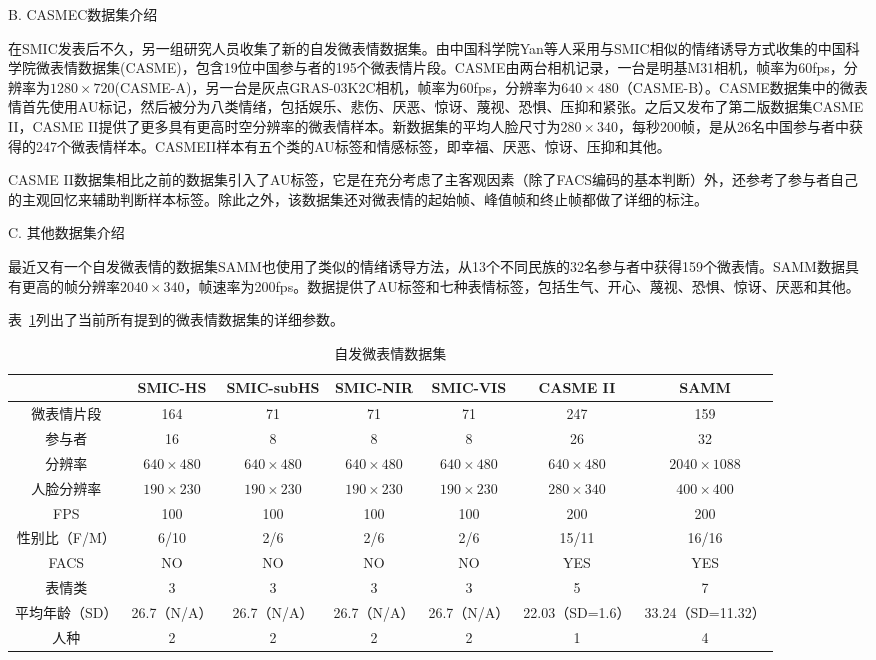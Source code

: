B. CASMEC数据集介绍

在SMIC发表后不久，另一组研究人员收集了新的自发微表情数据集。由中国科学院Yan等人采用与SMIC相似的情绪诱导方式收集的中国科学院微表情数据集(CASME)，包含19位中国参与者的195个微表情片段。CASME由两台相机记录，一台是明基M31相机，帧率为60fps，分辨率为$1280\times720$(CASME-A)，另一台是灰点GRAS-03K2C相机，帧率为60fps，分辨率为$640\times480$（CASME-B）。CASME数据集中的微表情首先使用AU标记，然后被分为八类情绪，包括娱乐、悲伤、厌恶、惊讶、蔑视、恐惧、压抑和紧张。之后又发布了第二版数据集CASME II，CASME II提供了更多具有更高时空分辨率的微表情样本。新数据集的平均人脸尺寸为$280\times340$，每秒200帧，是从26名中国参与者中获得的247个微表情样本。CASMEII样本有五个类的AU标签和情感标签，即幸福、厌恶、惊讶、压抑和其他。

CASME II数据集相比之前的数据集引入了AU标签，它是在充分考虑了主客观因素（除了FACS编码的基本判断）外，还参考了参与者自己的主观回忆来辅助判断样本标签。除此之外，该数据集还对微表情的起始帧、峰值帧和终止帧都做了详细的标注。

C. 其他数据集介绍

最近又有一个自发微表情的数据集SAMM也使用了类似的情绪诱导方法，从13个不同民族的32名参与者中获得159个微表情。SAMM数据具有更高的帧分辨率$2040\times340$，帧速率为200fps。数据提供了AU标签和七种表情标签，包括生气、开心、蔑视、恐惧、惊讶、厌恶和其他。

表~\ref{tab1}列出了当前所有提到的微表情数据集的详细参数。

\begin{table}[!htbp]
  \centering
  \caption{自发微表情数据集}
  \label{tab1}
  \footnotesize%
  \setlength{\tabcolsep}{4pt}%
  \renewcommand{\arraystretch}{1.2}%
  \begin{tabular}{c|cccccc}
    \hline
     & SMIC-HS & SMIC-subHS & SMIC-NIR & SMIC-VIS & CASME II & SAMM \\ \hline
    微表情片段 & 164 & 71 & 71 & 71 & 247 & 159 \\
    参与者 & 16 & 8 & 8 & 8 & 26 & 32 \\
    分辨率 & $640\times480$ & $640\times480$ & $640\times480$ & $640\times480$ & $640\times480$ & $2040\times1088$ \\
    人脸分辨率 & $190\times230$ & $190\times230$ & $190\times230$ & $190\times230$ & $280\times340$ & $400\times400$ \\
    FPS & 100 & 100 & 100 & 100 & 200 & 200 \\
    性别比（F/M） & 6/10 & 2/6 & 2/6 & 2/6 & 15/11 & 16/16 \\
    FACS & NO & NO & NO & NO & YES & YES \\
    表情类 & 3 & 3 & 3 & 3 & 5 & 7 \\
    平均年龄（SD） & 26.7（N/A） & 26.7（N/A） & 26.7（N/A） & 26.7（N/A） & 22.03（SD=1.6） & 33.24（SD=11.32） \\
    人种 & 2 & 2 & 2 & 2 & 1 & 4 \\ \hline
    \end{tabular}
\end{table}

